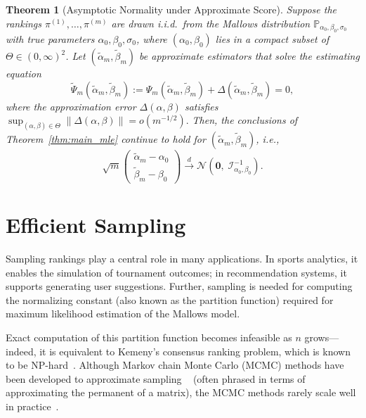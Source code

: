 \documentclass{article}
\newtheorem{theorem}{Theorem}[section] %
\begin{document}
\begin{theorem}[Asymptotic Normality under Approximate Score]\label{thm:approximate mle}
Suppose the rankings \(\pi^{(1)}, \dots, \pi^{(m)}\) are drawn i.i.d.\ from the Mallows distribution \(\mathbb{P}_{\alpha_0, \beta_0, \sigma_0}\) with true parameters \(\alpha_0, \beta_0, \sigma_0\), where \((\alpha_0, \beta_0)\) lies in a compact subset of \( \Theta\in(0, \infty)^2\). Let \((\tilde{\alpha}_m, \tilde{\beta}_m)\) be approximate estimators that solve the estimating equation
\[
\widetilde{\Psi}_m(\tilde{\alpha}_m, \tilde{\beta}_m) := \Psi_m(\tilde{\alpha}_m, \tilde{\beta}_m) + \Delta(\tilde{\alpha}_m, \tilde{\beta}_m) = 0,
\]
where the approximation error \(\Delta(\alpha, \beta)\) satisfies
$\sup_{(\alpha, \beta) \in \Theta} \| \Delta(\alpha, \beta) \| = o(m^{-1/2}).$
 Then, the conclusions of Theorem~\ref{thm:main_mle} continue to hold for \((\tilde{\alpha}_m, \tilde{\beta}_m)\), i.e.,     \[
    \sqrt{m}
    \begin{pmatrix}
        \tilde{\alpha}_m - \alpha_0 \\
        \tilde{\beta}_m - \beta_0
    \end{pmatrix}
    \xrightarrow{d}
    \mathcal{N}\left(
        \mathbf{0},\;
        \mathcal I_{\alpha_0, \beta_0}^{-1}
    \right).
    \]
\end{theorem}



\section{Efficient Sampling}\label{sec:ptas}
Sampling rankings play a central role in many  applications. In sports analytics, it enables the simulation of tournament outcomes; in recommendation systems, it supports generating user suggestions.
Further, sampling is needed for computing the normalizing constant (also known as the partition function) required for maximum likelihood estimation of the Mallows model. 

Exact computation of this partition function becomes infeasible as \(n\) grows—indeed, it is equivalent to Kemeny’s
consensus ranking problem, which is known to be NP-hard~\cite{shah2018simple}.
Although Markov chain Monte Carlo (MCMC) methods have been developed to approximate sampling ~\cite{ Jerrum:2004:PAA:1008731.1008738,  bezakova2008accelerating}
(often phrased in terms of approximating the permanent of a matrix), the MCMC methods rarely scale well in practice~\cite{newman2020fpras,Sankowski}.
\end{document}
